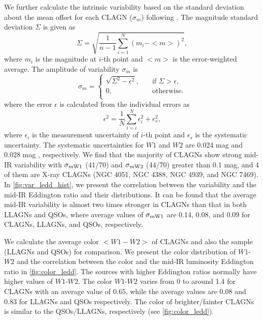\documentclass[linenumbers]{aastex631}
\begin{document}
We further calculate the intrinsic variability based on the standard deviation about the mean offset for each CLAGN ($\sigma_m$) following \citet{2019MNRAS.483.2362R} \citep[see also][etc]{2007AJ....134.2236S,2012ApJ...759L..31J}.
The magnitude standard deviation $\Sigma$ is given as
\begin{equation}
\Sigma=\sqrt{\frac{1}{n-1}\sum_{i=1}^{N}(m_i - <m>)^2},
\end{equation}
where $m_i$ is the magnitude at $i$-th point and $<m>$ is the error-weighted average.
The amplitude of variability $\sigma_m$ is  
\[\sigma_m  =
  \begin{cases}
    \sqrt{\Sigma^2 - \epsilon^2},  & \quad \text{if } \Sigma>\epsilon,\\
     0,                            & \quad  \text{otherwise.}\\
  \end{cases}
\]	               
where the error $\epsilon$ is calculated from the individual errors as
\begin{equation}
\epsilon^2=\frac{1}{N}\sum_{i=i}^{N}{\epsilon_{i}^{2} + \epsilon_{s}^2}, 
\end{equation}
where $\epsilon_{i}$ is the measurement uncertainty of $i$-th point and $\epsilon_{s}$ is the systematic uncertainty. The systematic uncertainties for $W1$ and $W2$ are 0.024 mag and 0.028 mag \citep{2011ApJ...735..112J}, respectively. We find that the majority of CLAGNs show strong mid-IR variability with $\sigma_{m \rm{W1}}$ (41/70)  and $\sigma_{m \rm{W2}}$ (44/70) greater than 0.1 mag, and 4 of them are X-ray CLAGNs (NGC 4051, NGC 4388, NGC 4939, and NGC 7469). In \autoref{fig:var_ledd_hist}, we present the correlation between the variability and the mid-IR Eddington ratio and their distributions. It can be found that the average mid-IR variability is almost two times stronger in CLAGNs than that in both LLAGNs and QSOs, where average values of $\sigma_{m \rm{W1}}$ are 0.14, 0.08, and 0.09 for CLAGNs, LLAGNs, and QSOs, respectively.  


We calculate the average color $<W1-W2>$ of CLAGNs and also the sample (LLAGNs and QSOs) for comparison. We present the color distribution of $W1$-$W2$ and the correlation between the color and the mid-IR luminosity Eddington ratio in \autoref{fig:color_ledd}. The sources with higher Eddington ratios normally have higher values of $W1$-$W2$. The color $W1$-$W2$ varies from 0 to around 1.4 for CLAGNs with an average value of 0.65, while the average values are 0.08 and 0.83 for LLAGNs and QSOs respectively. The color of brighter/fainter CLAGNs is similar to the QSOs/LLAGNs, respectively (see \autoref{fig:color_ledd}). 
\end{document}
